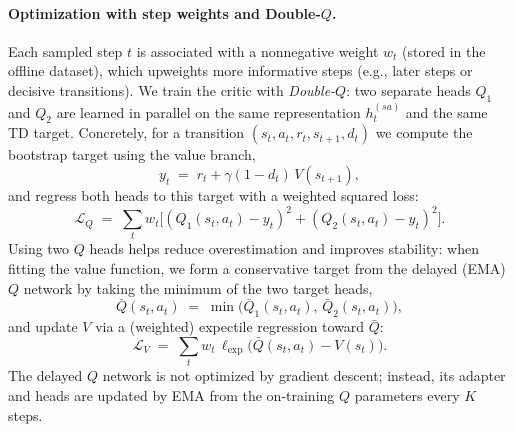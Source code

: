 \paragraph{Optimization with step weights and Double-$Q$.}
Each sampled step $t$ is associated with a nonnegative weight $w_t$ (stored in the offline dataset), which upweights more informative steps (e.g., later steps or decisive transitions).
We train the critic with \emph{Double-$Q$}: two separate heads $Q_1$ and $Q_2$ are learned in parallel on the same representation $h_t^{(sa)}$ and the same TD target. 
Concretely, for a transition $(s_t,a_t,r_t,s_{t+1},d_t)$ we compute the bootstrap target using the value branch,
\[
y_t \;=\; r_t + \gamma(1-d_t)\,V(s_{t+1}),
\]
and regress both heads to this target with a weighted squared loss:
\[
\mathcal{L}_Q \;=\; \sum_t w_t\Big[(Q_1(s_t,a_t)-y_t)^2 + (Q_2(s_t,a_t)-y_t)^2\Big].
\]
Using two $Q$ heads helps reduce overestimation and improves stability: when fitting the value function, we form a conservative target from the delayed (EMA) $Q$ network by taking the minimum of the two target heads,
\[
\bar Q(s_t,a_t) \;=\; \min\!\big(\bar Q_1(s_t,a_t),\,\bar Q_2(s_t,a_t)\big),
\]
and update $V$ via a (weighted) expectile regression toward $\bar Q$:
\[
\mathcal{L}_V \;=\; \sum_t w_t\,\ell_{\mathrm{exp}}\!\big(\bar Q(s_t,a_t)-V(s_t)\big).
\]
The delayed $Q$ network is not optimized by gradient descent; instead, its adapter and heads are updated by EMA from the on-training $Q$ parameters every $K$ steps.


